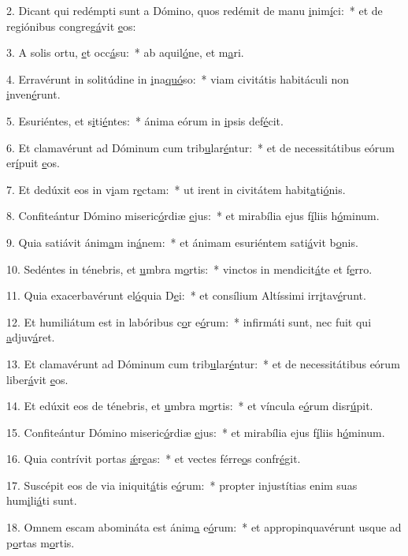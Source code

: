 2. Dicant qui redémpti sunt a Dómino, quos redémit de manu \uline{i}nim\uline{í}ci:~* et de regiónibus congreg\uline{á}vit \uline{e}os:\par 
3. A solis ortu, \uline{e}t occ\uline{á}su:~* ab aquil\uline{ó}ne, et m\uline{a}ri.\par 
4. Erravérunt in solitúdine in \uline{i}na\uline{quó}so:~* viam civitátis habitáculi non \uline{i}nven\uline{é}runt.\par 
5. Esuriéntes, et s\uline{i}ti\uline{é}ntes:~* ánima eórum in \uline{i}psis def\uline{é}cit.\par 
6. Et clamavérunt ad Dóminum cum trib\uline{u}lar\uline{é}ntur:~* et de necessitátibus eórum er\uline{í}puit \uline{e}os.\par 
7. Et dedúxit eos in v\uline{i}am r\uline{e}ctam:~* ut irent in civitátem habit\uline{a}ti\uline{ó}nis.\par 
8. Confiteántur Dómino miseric\uline{ó}rdiæ \uline{e}jus:~* et mirabília ejus f\uline{í}liis h\uline{ó}minum.\par 
9. Quia satiávit ánim\uline{a}m in\uline{á}nem:~* et ánimam esuriéntem sati\uline{á}vit b\uline{o}nis.\par 
10. Sedéntes in ténebris, et \uline{u}mbra m\uline{o}rtis:~* vinctos in mendicit\uline{á}te et f\uline{e}rro.\par 
11. Quia exacerbavérunt el\uline{ó}quia D\uline{e}i:~* et consílium Altíssimi irr\uline{i}tav\uline{é}runt.\par 
12. Et humiliátum est in labóribus c\uline{o}r e\uline{ó}rum:~* infirmáti sunt, nec fuit qui \uline{a}djuv\uline{á}ret.\par 
13. Et clamavérunt ad Dóminum cum trib\uline{u}lar\uline{é}ntur:~* et de necessitátibus eórum liber\uline{á}vit \uline{e}os.\par 
14. Et edúxit eos de ténebris, et \uline{u}mbra m\uline{o}rtis:~* et víncula e\uline{ó}rum disr\uline{ú}pit.\par 
15. Confiteántur Dómino miseric\uline{ó}rdiæ \uline{e}jus:~* et mirabília ejus f\uline{í}liis h\uline{ó}minum.\par 
16. Quia contrívit portas \uline{ǽ}r\uline{e}as:~* et vectes férre\uline{o}s confr\uline{é}git.\par 
17. Suscépit eos de via iniquit\uline{á}tis e\uline{ó}rum:~* propter injustítias enim suas hum\uline{i}li\uline{á}ti sunt.\par 
18. Omnem escam abomináta est ánim\uline{a} e\uline{ó}rum:~* et appropinquavérunt usque ad p\uline{o}rtas m\uline{o}rtis.\par 
